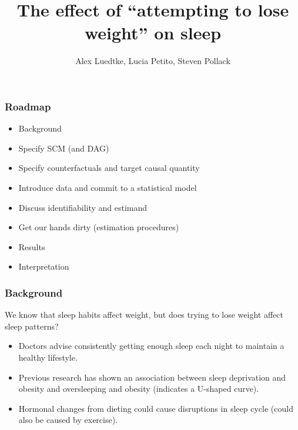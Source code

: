 \documentclass{beamer}
\title[Project Presentation]{ The effect of ``attempting to lose weight'' on sleep }
\author{Alex Luedtke, Lucia Petito, Steven Pollack}
\institute{PHC252D}
\date{}
\begin{document}
\maketitle 
\begin{frame}
 \frametitle{Roadmap} 
  \begin{itemize}
    \item Background
    \item Specify SCM (and DAG)
    \item Specify counterfactuals and target causal quantity
    \item Introduce data and commit to a statistical model
    \item Discuss identifiability and estimand
    \item Get our hands dirty (estimation procedures)
    \item Results
    \item Interpretation
  \end{itemize}
\end{frame}

\begin{frame}
 \frametitle{Background}
 We know that sleep habits affect weight, but does trying to lose weight affect sleep patterns?
  \begin{itemize}
    \item Doctors advise consistently getting enough sleep each night to maintain a healthy lifestyle.  
    \item Previous research has shown an association between sleep deprivation and obesity and oversleeping and obesity (indicates a U-shaped curve).
    \item Hormonal changes from dieting could cause disruptions in sleep cycle (could also be caused by exercise).
  \end{itemize}
\end{frame}
\end{document}
